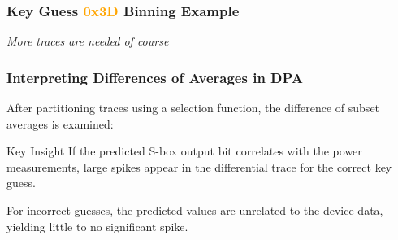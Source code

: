 \begin{frame}
    \frametitle{Key Guess \textcolor{orange}{0x3D} Binning Example}
    
    \centering
    \newline \newline
        \centering \textit{More traces are needed of course}

    
\end{frame}


\begin{frame}
    \frametitle{Interpreting Differences of Averages in DPA}

    After partitioning traces using a selection function, the difference of subset averages is examined:

    \begin{block}{Key Insight}
        If the predicted S-box output bit correlates with the power measurements, large spikes appear in the differential trace for the correct key guess.
    \end{block}

    For incorrect guesses, the predicted values are unrelated to the device data, yielding little to no significant spike.
\end{frame}

